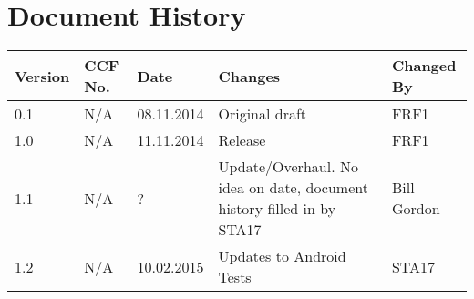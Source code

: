 \documentclass[10pt,a4paper]{article}
\begin{document}
\section{Document History}
\begin{tabular}{| p{1.5cm} | p{1.5cm} | p{2cm} | p{7cm} | p{2cm} |}
	\hline
	Version & CCF No. & Date & Changes & Changed By \\ \hline
	0.1 & N/A & 08.11.2014 & Original draft & FRF1 \\ \hline
	1.0 & N/A & 11.11.2014 & Release & FRF1 \\ \hline
	1.1 & N/A & ? & Update/Overhaul. No idea on date, document history filled in by STA17 & Bill Gordon \\ \hline
	1.2 & N/A & 10.02.2015 & Updates to Android Tests & STA17 \\ \hline
\end{tabular}



\end{document}
